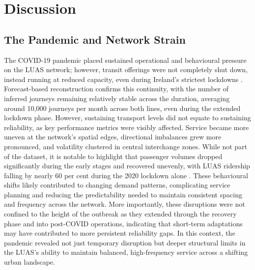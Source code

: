 \section*{Discussion}

\subsection*{The Pandemic and Network Strain}

    The COVID-19 pandemic placed sustained operational and behavioural pressure on the LUAS network; however, transit offerings were not completely shut down, instead running at reduced capacity, even during Ireland’s strictest lockdowns \parencite{nta2021report}. Forecast-based reconstruction confirms this continuity, with the number of inferred journeys remaining relatively stable across the duration, averaging around 10,000 journeys per month across both lines, even during the extended lockdown phase. However, sustaining transport levels did not equate to sustaining reliability, as key performance metrics were visibly affected. Service became more uneven at the network’s spatial edges, directional imbalances grew more pronounced, and volatility clustered in central interchange zones. While not part of the dataset, it is notable to highlight that passenger volumes dropped significantly during the early stages and recovered unevenly, with LUAS ridership falling by nearly 60 per cent during the 2020 lockdown alone \parencite{nta2021report}. These behavioural shifts likely contributed to changing demand patterns, complicating service planning and reducing the predictability needed to maintain consistent spacing and frequency across the network. More importantly, these disruptions were not confined to the height of the outbreak as they extended through the recovery phase and into post-COVID operations, indicating that short-term adaptations may have contributed to more persistent reliability gaps. In this context, the pandemic revealed not just temporary disruption but deeper structural limits in the LUAS’s ability to maintain balanced, high-frequency service across a shifting urban landscape.

